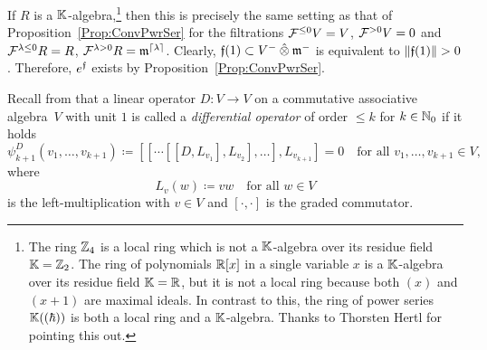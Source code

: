 \documentclass[\MainFolder/Text.tex]{subfiles}
\begin{document}
If $R$ is a $\mathbb{K}$-algebra,\footnote{The ring $\mathbb{Z}_4$ is a local ring which is not a $\mathbb{K}$-algebra over its residue field $\mathbb{K}=\mathbb{Z}_2$. The ring of polynomials $\mathbb{R}[x]$ in a single variable $x$ is a $\mathbb{K}$-algebra over its residue field $\mathbb{K}=\mathbb{R}$, but it is not a local ring because both $(x)$ and $(x+1)$ are maximal ideals. In contrast to this, the ring of power series $\mathbb{K}((\hbar))$ is both a local ring and a $\mathbb{K}$-algebra. Thanks to Thorsten Hertl for pointing this out.} then this is precisely the same setting as that of Proposition~\ref{Prop:ConvPwrSer} for the filtrations $\mathcal{F}^{\le 0} V = V$, $\mathcal{F}^{>0} V= 0$ and $\mathcal{F}^{\lambda\le 0} R = R$, $\mathcal{F}^{\lambda>0} R = \mathfrak{m}^{\lceil\lambda\rceil}$. Clearly, $\HTP(1)\subset V^- \COtimes \mathfrak{m}^-$ is equivalent to $\Norm{\HTP(1)}>0$. Therefore, $e^{\mathfrak{f}}$ exists by Proposition~\ref{Prop:ConvPwrSer}.

Recall from \cite[p.\,5]{Markl2015} that a linear operator $D: V\rightarrow V$ on a commutative associative algebra~$V$ with unit $1$ is called a \emph{differential operator} of order $\le k$ for $k\in \mathbb{N}_0$ if it holds\label{Page:DiffOp}
$$ \psi^D_{k+1}(v_1, \dotsc, v_{k+1}) \coloneqq [[\dotsb[[D,L_{v_1}],L_{v_2}],\dotsc],L_{v_{k+1}}] = 0 \quad\text{for all }v_1, \dotsc, v_{k+1}\in V, $$
where 
$$ L_v(w) \coloneqq v w\quad\text{for all }w\in V $$
is the left-multiplication with $v\in V$ and $[\cdot,\cdot]$ is the graded commutator. 

%
\end{document}
